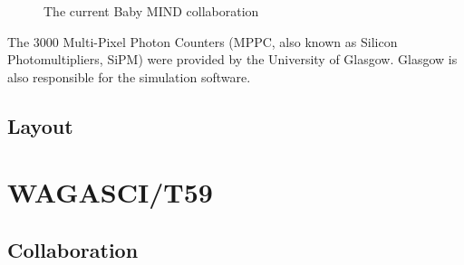 \begin{figure}[h!]
\centering
{}
\caption{The current Baby MIND collaboration}
\label{fig:collaboration}
\end{figure}

The 3000 Multi-Pixel Photon Counters (MPPC, also known as Silicon Photomultipliers, SiPM) were provided by the University of Glasgow. Glasgow is also responsible for the simulation software.
\subsection{Layout}


\section{WAGASCI/T59}


\subsection{Collaboration}

